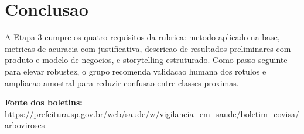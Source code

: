 \documentclass[12pt,a4paper]{article}
\begin{document}
\section{Conclusao}
A Etapa 3 cumpre os quatro requisitos da rubrica: metodo aplicado na base, metricas de acuracia com justificativa, descricao de resultados preliminares com produto e modelo de negocios, e storytelling estruturado. Como passo seguinte para elevar robustez, o grupo recomenda validacao humana dos rotulos e ampliacao amostral para reduzir confusao entre classes proximas.

\vspace{0.2cm}
\noindent\textbf{Fonte dos boletins:} \url{https://prefeitura.sp.gov.br/web/saude/w/vigilancia_em_saude/boletim_covisa/arboviroses}
\end{document}
